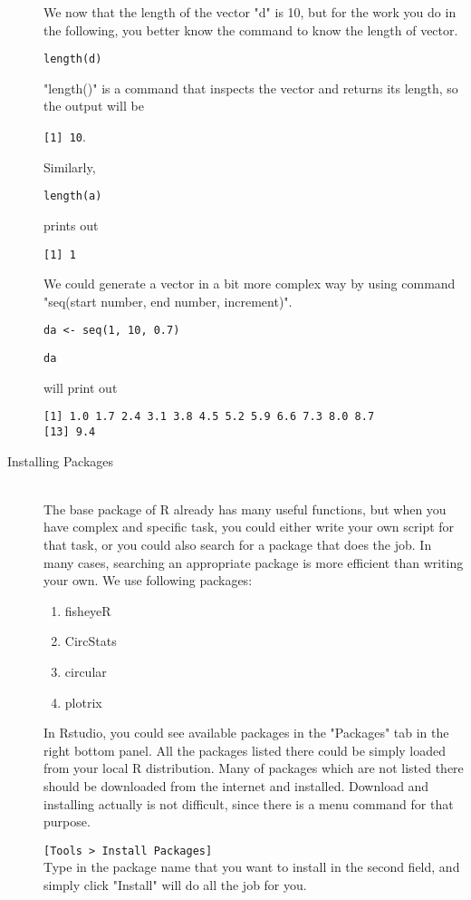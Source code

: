 \documentclass[11pnt]{article}
\begin{document}
\begin{description}
We now that the length of the vector "d" is 10, but for the work you do in the following, you better know the command to know the length of vector.

\verb"length(d)"

"length()" is a command that inspects the vector and returns its length, so the output will be

\verb"[1] 10". 

Similarly, 

\verb"length(a)"

prints out

\verb"[1] 1"

We could generate a vector in a bit more complex way by using command "seq(start number, end number, increment)". 

\verb"da <- seq(1, 10, 0.7)"

\verb"da"

will print out

\begin{verbatim}
[1] 1.0 1.7 2.4 3.1 3.8 4.5 5.2 5.9 6.6 7.3 8.0 8.7
[13] 9.4
\end{verbatim}

\item[Installing Packages]\hfill\\

The base package of R already has many useful functions, but when you have complex and specific task, you could either write your own script for that task, or you could also search for a package that does the job. In many cases, searching an appropriate package is more efficient than writing your own. We use following packages:
\begin{enumerate}
\item fisheyeR
\item CircStats
\item circular
\item plotrix
\end{enumerate}
In Rstudio, you could see available packages in the "Packages" tab in the right bottom panel. All the packages listed there could be simply loaded from your local R distribution. Many of packages which are not listed there should be downloaded from the internet and installed. Download and installing actually is not difficult, since there is a menu command for that purpose. 

\verb"[Tools > Install Packages]"\hfill\\
Type in the package name that you want to install in the second field, and simply click "Install" will do all the job for you.


\end{description}
\end{document}
